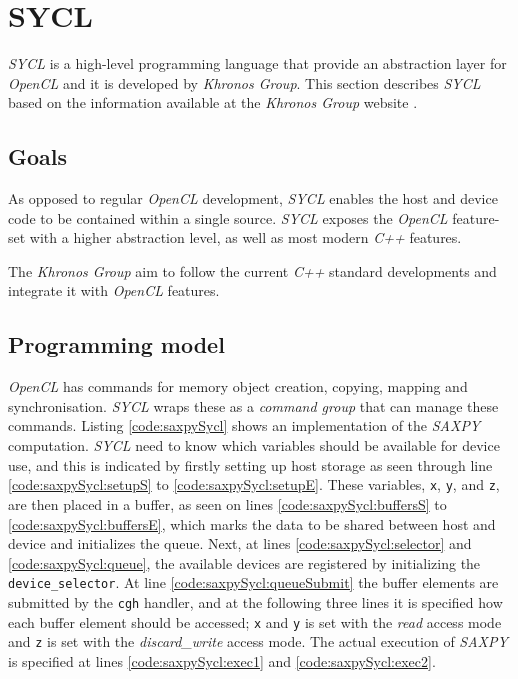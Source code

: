 \section{SYCL}
\textit{SYCL} is a high-level programming language that provide an abstraction layer for \textit{OpenCL} and it is developed by \textit{Khronos Group}. This section describes \textit{SYCL} based on the information available at the \textit{Khronos Group} website \cite{khronosSYCL}.

\subsection{Goals}
As opposed to regular \textit{OpenCL} development, \textit{SYCL} enables the host and device code to be contained within a single source. \textit{SYCL} exposes the \textit{OpenCL} feature-set with a higher abstraction level, as well as most modern \textit{C++} features. 

The \textit{Khronos Group} aim to follow the current \textit{C++} standard developments and integrate it with \textit{OpenCL} features.

\subsection{Programming model}
\textit{OpenCL} has commands for memory object creation, copying, mapping and synchronisation. \textit{SYCL} wraps these as a \textit{command group} that can manage these commands. Listing \ref{code:saxpySycl} shows an implementation of the \textit{SAXPY} computation. \textit{SYCL} need to know which variables should be available for device use, and this is indicated by firstly setting up host storage as seen through line \ref{code:saxpySycl:setupS} to \ref{code:saxpySycl:setupE}. These variables, \texttt{x}, \texttt{y}, and \texttt{z}, are then placed in a buffer, as seen on lines \ref{code:saxpySycl:buffersS} to \ref{code:saxpySycl:buffersE}, which marks the data to be shared between host and device and initializes the queue. Next, at lines \ref{code:saxpySycl:selector} and \ref{code:saxpySycl:queue}, the available devices are registered by initializing the \texttt{device\_selector}. At line \ref{code:saxpySycl:queueSubmit} the buffer elements are submitted by the \texttt{cgh} handler, and at the following three lines it is specified how each buffer element should be accessed; \texttt{x} and \texttt{y} is set with the \textit{read} access mode and \texttt{z} is set with the \textit{discard\_write} access mode. The actual execution of \textit{SAXPY} is specified at lines \ref{code:saxpySycl:exec1} and \ref{code:saxpySycl:exec2}.

